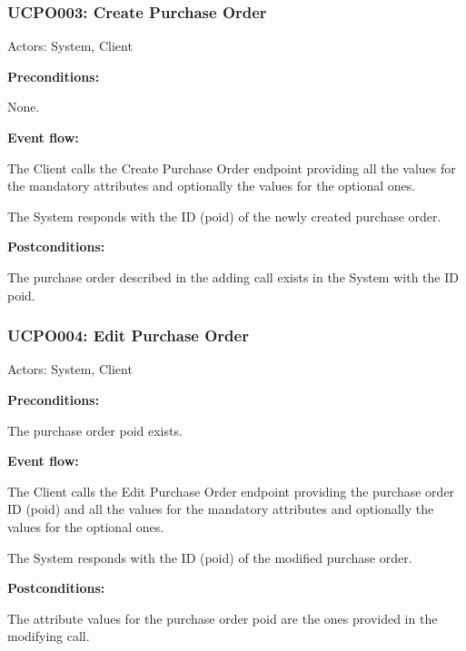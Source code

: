 \begin{ucbox}{\subsubsection{UCPO003: Create Purchase Order}}
\label{UCPO003}

Actors: System, Client

\textbf{Preconditions:}

\ucitem None.

\textbf{Event flow:}

\ucitem The Client calls the Create Purchase Order endpoint providing all the values for the mandatory attributes and optionally the values for the optional ones.

\ucitem The System responds with the ID (poid) of the newly created purchase order.

\textbf{Postconditions:}

\ucitem The purchase order described in the adding call exists in the System with the ID poid.

\end{ucbox}

\begin{ucbox}{\subsubsection{UCPO004: Edit Purchase Order}}
\label{UCPO004}

Actors: System, Client

\textbf{Preconditions:}

\ucitem The purchase order poid exists.

\textbf{Event flow:}

\ucitem The Client calls the Edit Purchase Order endpoint providing the purchase order ID (poid) and all the values for the mandatory attributes and optionally the values for the 
optional ones.

\ucitem The System responds with the ID (poid) of the modified purchase order.

\textbf{Postconditions:}

\ucitem The attribute values for the purchase order poid are the ones provided in the modifying call.

\end{ucbox}

